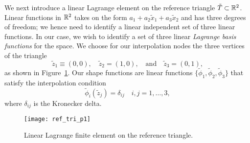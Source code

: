 We next introduce a linear Lagrange element on the reference triangle $\tilde T \subset \mathbb{R}^2$.  Linear functions in $\mathbb{R}^2$ takes on the form $a_1 + a_2 \tilde x_1 + a_3 \tilde x_2$ and has three degrees of freedom; we hence need to identify a linear independent set of three linear functions.  In our case, we wish to identify a set of three linear \emph{Lagrange basis functions} for the space.  We choose for our interpolation nodes the three vertices of the triangle
\begin{equation*}
  \tilde z_1 \equiv (0,0),
  \quad \tilde z_2 = (1,0),
  \quad \text{and} \quad \tilde z_3 = (0,1),
\end{equation*}
as shown in Figure~\ref{fig:fe_ref_tri_p1}. Our shape functions are linear functions $\{ \tilde \phi_1, \tilde \phi_2, \tilde \phi_3 \}$ that satisfy the interpolation condition
\begin{equation}
  \tilde \phi_i(\tilde z_j) = \delta_{ij} \quad i,j = 1,\dots,3,
   \label{eq:fe_interp_tri}
\end{equation}
where $\delta_{ij}$ is the Kronecker delta.

\begin{figure}
  \centering
  \texttt{[image: ref\_tri\_p1]}
  \caption{Linear Lagrange finite element on the reference triangle.}
  \label{fig:fe_ref_tri_p1}
\end{figure}

